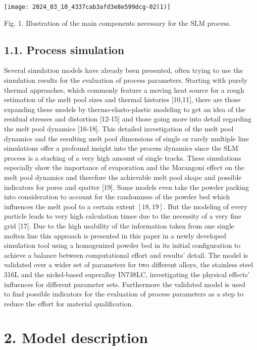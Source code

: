 \documentclass[10pt]{article}
\begin{document}
\begin{center}
\texttt{[image: 2024\_03\_10\_4337cab3afd3e8e599dcg-02(1)]}
\end{center}

Fig. 1. Illustration of the main components necessary for the SLM process.

\subsection*{1.1. Process simulation}
Several simulation models have already been presented, often trying to use the simulation results for the evaluation of process parameters. Starting with purely thermal approaches, which commonly feature a moving heat source for a rough estimation of the melt pool sizes and thermal histories [10,11], there are those expanding these models by thermo-elasto-plastic modeling to get an idea of the residual stresses and distortion [12-15] and those going more into detail regarding the melt pool dynamics [16-18]. This detailed investigation of the melt pool dynamics and the resulting melt pool dimensions of single or rarely multiple line simulations offer a profound insight into the process dynamics since the SLM process is a stacking of a very high amount of single tracks. These simulations especially show the importance of evaporation and the Marangoni effect on the melt pool dynamics and therefore the achievable melt pool shape and possible indicators for pores and spatter [19]. Some models even take the powder packing into consideration to account for the randomness of the powder bed which influences the melt pool to a certain extent $[18,19]$. But the modeling of every particle leads to very high calculation times due to the necessity of a very fine grid [17]. Due to the high usability of the information taken from one single molten line this approach is presented in this paper in a newly developed simulation tool using a homogenized powder bed in its initial configuration to achieve a balance between computational effort and results' detail. The model is validated over a wider set of parameters for two different alloys, the stainless steel 316L and the nickel-based superalloy IN738LC, investigating the physical effects' influences for different parameter sets. Furthermore the validated model is used to find possible indicators for the evaluation of process parameters as a step to reduce the effort for material qualification.

\section*{2. Model description}
\end{document}
